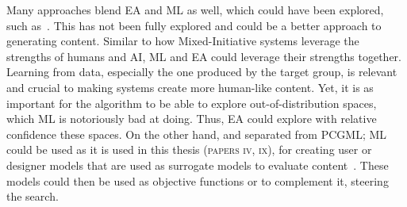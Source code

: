 Many approaches blend EA and ML as well, which could have been explored, such as~\cite{schrum_interactive_2020}. This has not been fully explored and could be a better approach to generating content. Similar to how Mixed-Initiative systems leverage the strengths of humans and AI, ML and EA could leverage their strengths together. Learning from data, especially the one produced by the target group, is relevant and crucial to making systems create more human-like content. Yet, it is as important for the algorithm to be able to explore out-of-distribution spaces, which ML is notoriously bad at doing. Thus, EA could explore with relative confidence these spaces. On the other hand, and separated from PCGML; ML could be used as it is used in this thesis (\textsc{papers iv, ix}), for creating user or designer models that are used as surrogate models to evaluate content~\cite{migkotzidis_susketch_2021,yannakakis_experience-driven_2011}. These models could then be used as objective functions or to complement it, steering the search.





